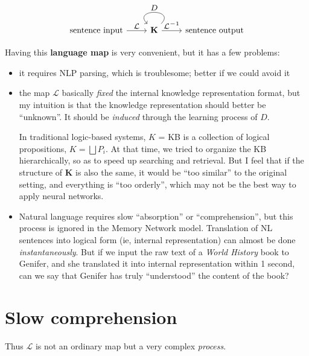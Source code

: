 \documentclass[12pt]{article}
\begin{document}
\begin{equation}
\begin{tikzcd}
\mbox{sentence input}\arrow[r,"\scalebox{1.3}{$\mathcal{L}$}"] & \mathbf{K} \arrow[r,"\scalebox{1.3}{$\mathcal{L}^{-1}$}"] \arrow[loop,"\scalebox{1.3}{$D$}",swap,looseness=4] & \mbox{sentence output}
\end{tikzcd}
\end{equation}

Having this \textbf{language map} is very convenient, but it has a few problems:
\begin{itemize}

\item it requires NLP parsing, which is troublesome; better if we could avoid it

\item the map $\mathcal{L}$ basically \textit{fixed} the internal knowledge representation format, but my intuition is that the knowledge representation should better be ``unknown''.  It should be \textit{induced} through the learning process of $D$.

In traditional logic-based systems, $K$ = KB is a collection of logical propositions, $ K = \bigsqcup P_i $.  At that time, we tried to organize the KB hierarchically, so as to speed up searching and retrieval.  But I feel that if the structure of $\mathbf{K}$ is also the same, it would be ``too similar'' to the original setting, and everything is ``too orderly'', which may not be the best way to apply neural networks.

\item Natural language requires slow ``absorption'' or ``comprehension'', but this process is ignored in the Memory Network model.  Translation of NL sentences into logical form (ie, internal representation) can almost be done \textit{instantaneous\-ly}.  But if we input the raw text of a \textit{World History} book to Genifer, and she translated it into internal representation within 1 second, can we say that Genifer has truly ``understood'' the content of the book?

\end{itemize}

\section{Slow comprehension}

Thus $\mathcal{L}$ is not an ordinary map but a very complex \textit{process}.
\end{document}
